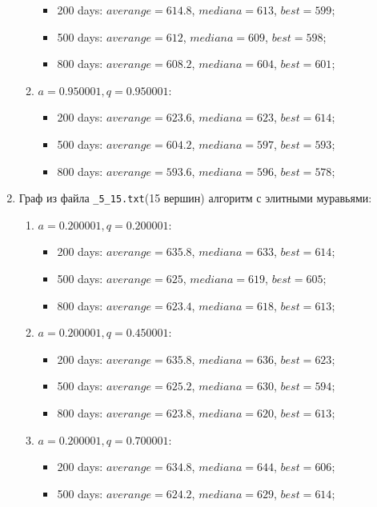\begin{enumerate}
\begin{enumerate}
		\begin{itemize}
			\item 200 days: $averange =  614.8$, $mediana =  613$, $best = 599$;
			\item 500 days: $averange =  612$, $mediana =  609$, $best = 598$;
			\item 800 days: $averange =  608.2$, $mediana =  604$, $best = 601$;
		\end{itemize}
		\item $a= 0.950001, q= 0.950001$:
		\begin{itemize}
			\item 200 days: $averange =  623.6$, $mediana =  623$, $best = 614$;
			\item 500 days: $averange =  604.2$, $mediana =  597$, $best = 593$;
			\item 800 days: $averange =  593.6$, $mediana =  596$, $best = 578$;
		\end{itemize}
	\end{enumerate}
	\item Граф из файла \texttt{\_5\_15.txt}(15 вершин) алгоритм с элитными муравьями:
	\begin{enumerate}
		\item $a= 0.200001, q= 0.200001$:
		\begin{itemize}
			\item 200 days: $averange = 635.8$, $mediana = 633$, $best = 614$;
			\item 500 days: $averange = 625$, $mediana = 619$, $best = 605$;
			\item 800 days: $averange = 623.4$, $mediana = 618$, $best = 613$;
		\end{itemize}
		\item $a= 0.200001, q= 0.450001$:
		\begin{itemize}
			\item 200 days: $averange = 635.8$, $mediana = 636$, $best = 623$;
			\item 500 days: $averange = 625.2$, $mediana = 630$, $best = 594$;
			\item 800 days: $averange = 623.8$, $mediana = 620$, $best = 613$;
		\end{itemize}
		\item $a= 0.200001, q= 0.700001$:
		\begin{itemize}
			\item 200 days: $averange = 634.8$, $mediana = 644$, $best = 606$;
			\item 500 days: $averange = 624.2$, $mediana = 629$, $best = 614$;

\end{itemize}
\end{enumerate}
\end{enumerate}
